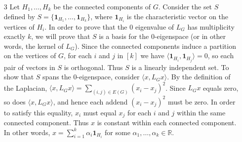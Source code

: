 \documentclass{article}
\newcommand{\R}{\mathbb{R}}
\newcommand{\1}{\mathbf{1}}
\newcommand{\0}{\mathbf{0}}
\begin{document}
\begin{enumerate}
    \item[3]
      Let $H_1, \dotsc, H_k$ be the connected components of $G$.
      Consider the set $S$ defined by $S = \{\1_{H_1}, \dotsc, \1_{H_k}\}$, where $\1_{H_i}$ is the characteristic vector on the vertices of $H_i$.
      In order to prove that the $0$ eigenvalue of $L_G$ has multiplicity exactly $k$, we will prove that $S$ is a basis for the $0$-eigenspace (or in other words, the kernel of $L_G$).
      Since the connected components induce a partition on the vertices of $G$, for each $i$ and $j$ in $[k]$ we have $\langle \1_{H_i}, \1_{H_j} \rangle = 0$, so each pair of vectors in $S$ is orthogonal.
      Thus $S$ is a linearly independent set.
      To show that $S$ spans the $0$-eigenspace, consider $\langle x, L_G x \rangle$.
      By the definition of the Laplacian, $\langle x, L_G x \rangle = \sum_{(i, j) \in E(G)} (x_i - x_j)^2$.
      Since $L_G x$ equals zero, so does $\langle x, L_G x \rangle$, and hence each addend $(x_i - x_j)^2$ must be zero.
      In order to satisfy this equality, $x_i$ must equal $x_j$ for each $i$ and $j$ within the same connected component.
      Thus $x$ is constant within each connected component.
      In other words, $x = \sum_{i = 1}^k \alpha_i \1_{H_i}$ for some $\alpha_1, \dotsc, \alpha_k \in \R$.


\end{enumerate}
\end{document}
